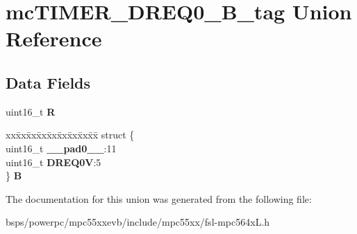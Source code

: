 \hypertarget{unionmcTIMER__DREQ0__16B__tag}{}\section{mc\+T\+I\+M\+E\+R\+\_\+\+D\+R\+E\+Q0\+\_\+B\+\_\+tag Union Reference}
\label{unionmcTIMER__DREQ0__16B__tag}
\subsection*{Data Fields}
\begin{DoxyCompactItemize}
\item 
\mbox{\label{unionmcTIMER__DREQ0__16B__tag_ad6591b23d34d3765ca0fbbd22b28ec28}} 
uint16\+\_\+t {\bfseries R}
\item 
\mbox{\label{unionmcTIMER__DREQ0__16B__tag_a779078b7ccced79ac60a87e1159f5e0a}} 
\begin{tabbing}
xx\=xx\=xx\=xx\=xx\=xx\=xx\=xx\=xx\=\kill
struct \{\\
\>uint16\_t {\bfseries \_\_pad0\_\_}:11\\
\>uint16\_t {\bfseries DREQ0V}:5\\
\} {\bfseries B}\\

\end{tabbing}\end{DoxyCompactItemize}


The documentation for this union was generated from the following file\+:\begin{DoxyCompactItemize}
\item 
bsps/powerpc/mpc55xxevb/include/mpc55xx/fsl-\/mpc564x\+L.\+h\end{DoxyCompactItemize}
